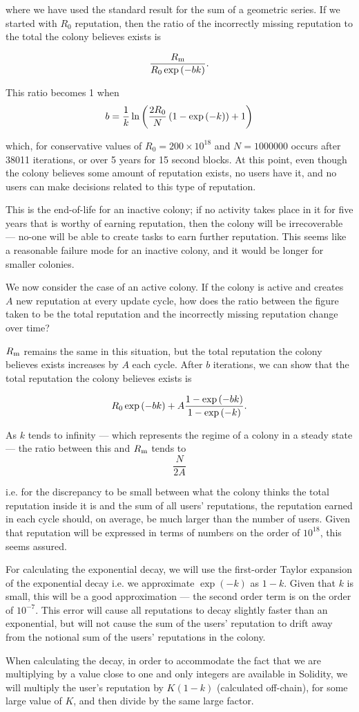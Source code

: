 \noindent where we have used the standard result for the sum of a geometric series. If we started with $R_0$ reputation, then the ratio of the incorrectly missing reputation to the total the colony believes exists is

$$\frac{R_{\rm m}}{R_0\exp\left(-bk\right)}.$$


This ratio becomes 1 when
$$ b = \frac{1}{k}\ln\left(\frac{2R_{\rm 0}}{N}\left(1-\exp\left(-k\right)\right) +1   \right)$$


\noindent which, for conservative values of $R_0 = 200\times10^{18}$ and $N=1000000$ occurs after 38011 iterations, or over 5 years for 15 second blocks. At this point, even though the colony believes some amount of reputation exists, no users have it, and no users can make decisions related to this type of reputation.

This is the end-of-life for an inactive colony; if no activity takes place in it for five years that is worthy of earning reputation, then the colony will be irrecoverable --- no-one will be able to create tasks to earn further reputation. This seems like a reasonable failure mode for an inactive colony, and it would be longer for smaller colonies. 

We now consider the case of an active colony. If the colony is active and creates $A$ new reputation at every update cycle, how does the ratio between the figure taken to be the total reputation and the incorrectly missing reputation change over time?

$R_{\rm m}$ remains the same in this situation, but the total reputation the colony believes exists increases by $A$ each cycle. After $b$ iterations, we can show that the total reputation the colony believes exists is

$$R_{\rm 0}\exp\left(-bk\right) + A\frac{1-\exp\left(-bk\right)}{1-\exp\left(-k\right)}.$$


As $k$ tends to infinity --- which represents the regime of a colony in a steady state --- the ratio between this and $R_{\rm m}$ tends to 
$$\frac{N}{2A}$$

\noindent i.e. for the discrepancy to be small between what the colony thinks the total reputation inside it is and the sum of all users' reputations, the reputation earned in each cycle should, on average, be much larger than the number of users. Given that reputation will be expressed in terms of numbers on the order of $10^{18}$, this seems assured.

For calculating the exponential decay, we will use the first-order Taylor expansion of the exponential decay i.e. we approximate $\exp\left(-k\right)$ as $1-k$. Given that $k$ is small, this will be a good approximation --- the second order term is on the order of $10^{-7}$. This error will cause all reputations to decay slightly faster than an exponential, but will not cause the sum of the users' reputation to drift away from the notional sum of the users' reputations in the colony.

When calculating the decay, in order to accommodate the fact that we are multiplying by a value close to one and only integers are available in Solidity, we will multiply the user's reputation by $K(1-k)$ (calculated off-chain), for some large value of $K$, and then divide by the same large factor.